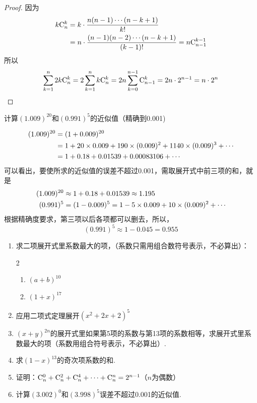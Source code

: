 \begin{proof}
因为
\[\begin{split}
    k{\rm C}^{k}_{n}&=k\cdot \dfrac{n(n-1)\cdots (n-k+1)}{k!}\\
    &=n\cdot \dfrac{(n-1)(n-2)\cdots (n-k+1)}{(k-1)!}=n{\rm C}^{k-1}_{n-1}
\end{split}\]
所以
\[\sum^n_{k=1}2k{\rm C}^{k}_{n}=2\sum^n_{k=1}k{\rm C}^{k}_{n}=2n\sum^{n-1}_{k=0}{\rm C}^{k}_{n-1}=2n\cdot 2^{n-1}=n\cdot 2^n\]
\end{proof}


\begin{example}
    计算$(1.009)^{20}$和$(0.991)^{5}$的近似值（精确到0.001)
\end{example}

\begin{solution}
\[\begin{split}
    (1.009)^{20}&=(1+0.009)^{20}\\
&=1+20\times0.009+190\times(0.009)^2+1140\times(0.009)^3+\cdots\\
&=1+0.18+0.01539+0.00083106+\cdots
\end{split}\]
可以看出，要使所求的近似值的误差不超过0.001，需取展开式中前三项的和，就是
\[\begin{split}
(1.009)^{20}&\approx 1+0.18+0.01539\approx 1.195\\
(0.991)^5&=(1-0.009)^5=1-5\times0.009+10\times(0.009)^2+\cdots    
\end{split}\]
根据精确度要求，第三项以后各项都可以删去，所以，
\[(0.991)^5\approx 1-0.045=0.955\]
\end{solution}

\begin{ex}
\begin{enumerate}
    \item 求二项展开式里系数最大的项，（系数只需用组合数符号表示，不必算出）：
\begin{multicols}{2}
\begin{enumerate}[(1)]
    \item $(a+b)^{10}$
    \item $(1+x)^{17}$
\end{enumerate}
\end{multicols}
    \item  应用二项式定理展开$(x^2+2x+2)^5$
    \item  $(x+y)^{2n}$的展开式里如果第5项的系数与第13项的系数相等，求展开式里系数最大的项（系数用组合符号表示，不必算出）.
    \item  求$(1-x)^{13}$的奇次项系数的和.
    \item 证明：${\rm C}^{0}_{n}+{\rm C}^{2}_{n}+{\rm C}^{4}_{n}+\cdots+{\rm C}^{n}_{n}=2^{n-1}$（$n$为偶数）
    \item 计算$(3.002)^0$和$(3.998)^5$误差不超过0.001的近似值.
\end{enumerate}
\end{ex}

